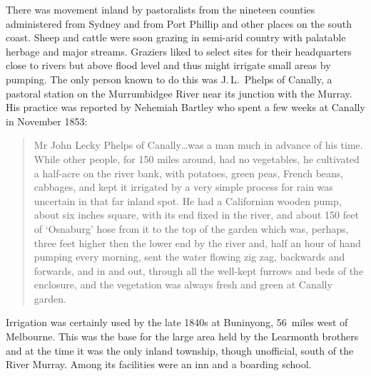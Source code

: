 There was movement inland by pastoralists from the nineteen counties
administered from Sydney and from Port Phillip and other places on the
south coast.  Sheep and cattle were soon grazing in semi-arid country
with palatable herbage and major streams.  Graziers liked to select
sites for their headquarters close to rivers but above flood level and
thus might irrigate small areas by pumping.  The only person known to
do this was J.\,L.~Phelps of Canally, a pastoral station on the
Murrumbidgee River near its junction with the Murray.  His practice
was reported by Nehemiah Bartley who spent a few weeks at Canally in
November 1853:
\begin{quote}
	Mr John Lecky Phelps of Canally\ldots was a man much in
	advance of his time.  While other people, for 150 miles
	around, had no vegetables, he cultivated a half-acre on the
	river bank, with potatoes, green peas, French beans, cabbages,
	and kept it irrigated by a very simple process for rain was
	uncertain in that far inland spot.  He had a Californian
	wooden pump, about six inches square, with its end fixed in
	the river, and about 150 feet of `Osnaburg' hose from it to
	the top of the garden which was, perhaps, three feet higher
	then the lower end by the river and, half an hour of hand
	pumping every morning, sent the water flowing zig zag,
	backwards and forwards, and in and out, through all the
	well-kept furrows and beds of the enclosure, and the
	vegetation was always fresh and green at Canally
	garden.
\end{quote}

Irrigation was certainly used by the late 1840s at Buninyong, 56~miles
west of Melbourne.  This was the base for the large area held by the
Learmonth brothers and at the time it was the only inland township,
though unofficial, south of the River Murray.  Among its facilities
were an inn and a boarding school.

